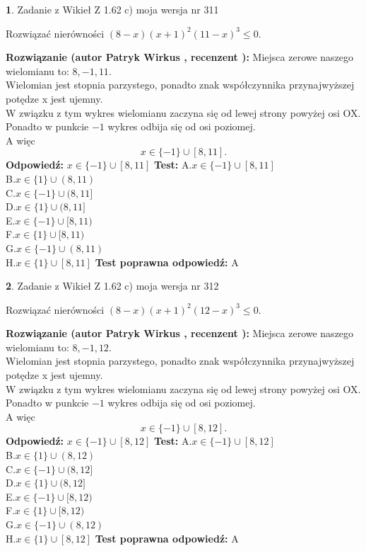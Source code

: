 \documentclass[12pt, a4paper]{article}
\theoremstyle{definition} %
\newtheorem{zad}{}
\newcommand{\zadStart}[1]{\begin{zad}#1\newline}
\newcommand{\zadStop}{\end{zad}}
\newcommand{\rozwStart}[2]{\noindent \textbf{Rozwiązanie (autor #1 , recenzent #2): }\newline}
\newcommand{\rozwStop}{\newline}
\newcommand{\odpStart}{\noindent \textbf{Odpowiedź:}\newline}
\newcommand{\odpStop}{\newline}
\newcommand{\testStart}{\noindent \textbf{Test:}\newline}
\newcommand{\testStop}{\newline}
\newcommand{\kluczStart}{\noindent \textbf{Test poprawna odpowiedź:}\newline}
\newcommand{\kluczStop}{\newline}
\begin{document}
\zadStart{Zadanie z Wikieł Z 1.62 c) moja wersja nr 311}

Rozwiązać nierówności $(8-x)(x+1)^{2}(11-x)^{3}\le0$.
\zadStop
\rozwStart{Patryk Wirkus}{}
Miejsca zerowe naszego wielomianu to: $8, -1, 11$.\\
Wielomian jest stopnia parzystego, ponadto znak współczynnika przy\linebreak najwyższej potędze x jest ujemny.\\ W związku z tym wykres wielomianu zaczyna się od lewej strony powyżej osi OX.\\
Ponadto w punkcie $-1$ wykres odbija się od osi poziomej.\\
A więc $$x \in \{-1\} \cup [8,11].$$
\rozwStop
\odpStart
$x \in \{-1\} \cup [8,11]$
\odpStop
\testStart
A.$x \in \{-1\} \cup [8,11]$\\
B.$x \in \{1\} \cup (8,11)$\\
C.$x \in \{-1\} \cup (8,11]$\\
D.$x \in \{1\} \cup (8,11]$\\
E.$x \in \{-1\} \cup [8,11)$\\
F.$x \in \{1\} \cup [8,11)$\\
G.$x \in \{-1\} \cup (8,11)$\\
H.$x \in \{1\} \cup [8,11]$
\testStop
\kluczStart
A
\kluczStop



\zadStart{Zadanie z Wikieł Z 1.62 c) moja wersja nr 312}

Rozwiązać nierówności $(8-x)(x+1)^{2}(12-x)^{3}\le0$.
\zadStop
\rozwStart{Patryk Wirkus}{}
Miejsca zerowe naszego wielomianu to: $8, -1, 12$.\\
Wielomian jest stopnia parzystego, ponadto znak współczynnika przy\linebreak najwyższej potędze x jest ujemny.\\ W związku z tym wykres wielomianu zaczyna się od lewej strony powyżej osi OX.\\
Ponadto w punkcie $-1$ wykres odbija się od osi poziomej.\\
A więc $$x \in \{-1\} \cup [8,12].$$
\rozwStop
\odpStart
$x \in \{-1\} \cup [8,12]$
\odpStop
\testStart
A.$x \in \{-1\} \cup [8,12]$\\
B.$x \in \{1\} \cup (8,12)$\\
C.$x \in \{-1\} \cup (8,12]$\\
D.$x \in \{1\} \cup (8,12]$\\
E.$x \in \{-1\} \cup [8,12)$\\
F.$x \in \{1\} \cup [8,12)$\\
G.$x \in \{-1\} \cup (8,12)$\\
H.$x \in \{1\} \cup [8,12]$
\testStop
\kluczStart
A
\kluczStop
\end{document}
